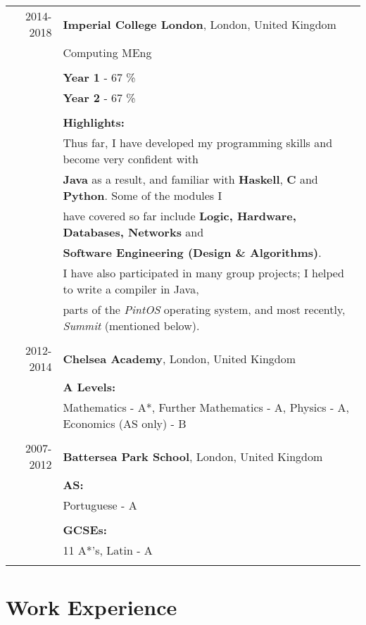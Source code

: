 \documentclass[a4paper,10pt]{article}
\begin{document}
	\begin{tabular}{rl}	
		2014-2018 & \textbf{Imperial College London}, London, United Kingdom \\& 
		Computing MEng\\& \\&
		\textbf{Year 1} - 67 \% \\& 
		\textbf{Year 2} - 67 \%  \\& \\&
		\textbf{Highlights:}\\& 
		
		Thus far, I have developed my programming skills and become very confident with  \\&
		\textbf{Java} as a result, and familiar with \textbf{Haskell}, \textbf{C} and \textbf{Python}. Some of the modules I\\&
		have covered so far include \textbf{Logic, Hardware, Databases, Networks} and \\&
		\textbf{Software Engineering (Design \& Algorithms)}. \\& 
		I have also participated in many group projects; I helped to write a compiler in Java, \\& 
	 	parts of the \textit{PintOS} operating system, and most recently, \textit{Summit} (mentioned below).
		 \\\multicolumn{2}{c}{} \\
		
		2012-2014 & \textbf{Chelsea Academy}, London, United Kingdom \\&
		\textbf{A Levels:} \\&
		Mathematics - A*, Further Mathematics - A, Physics - A, Economics (AS only) - B 
		\\\multicolumn{2}{c}{} \\
		
		2007-2012 & \textbf{Battersea Park School}, London, United Kingdom \\& 
		\textbf{AS:} \\&
		Portuguese - A \\& \\&
		\textbf{GCSEs:} \\& 
		11 A*'s, Latin - A
		\\\multicolumn{2}{c}{} \\
	
	\end{tabular}
	
	
	\section*{Work Experience}
		
\end{document}
